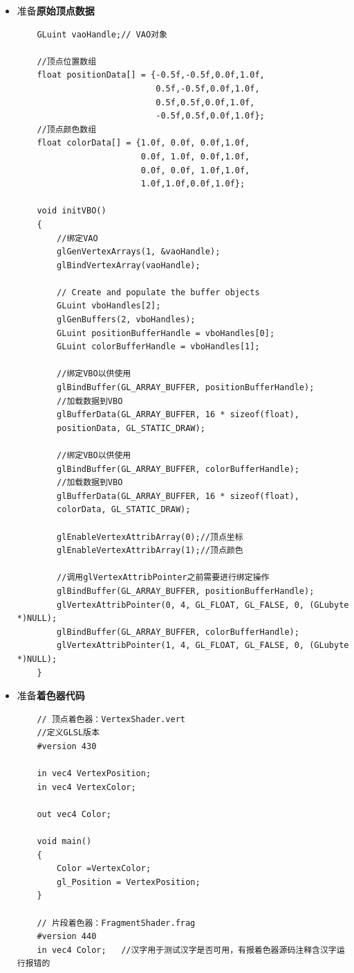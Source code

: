 \documentclass[UTF8,a4paper,8pt]{ctexart}
\begin{document}
					\begin{itemize}[itemindent = 1em]
						\item 准备\textbf{原始顶点数据}
							\begin{lstlisting}
	GLuint vaoHandle;// VAO对象  
	
	//顶点位置数组    
	float positionData[] = {-0.5f,-0.5f,0.0f,1.0f,  
							0.5f,-0.5f,0.0f,1.0f,  
							0.5f,0.5f,0.0f,1.0f,  
							-0.5f,0.5f,0.0f,1.0f};  
	//顶点颜色数组    
	float colorData[] = {1.0f, 0.0f, 0.0f,1.0f,  
					 	 0.0f, 1.0f, 0.0f,1.0f,  
						 0.0f, 0.0f, 1.0f,1.0f,  
						 1.0f,1.0f,0.0f,1.0f};  						
	
	void initVBO()  
	{  
		//绑定VAO  
		glGenVertexArrays(1, &vaoHandle);  
		glBindVertexArray(vaoHandle);  
		
		// Create and populate the buffer objects    
		GLuint vboHandles[2];  
		glGenBuffers(2, vboHandles);  
		GLuint positionBufferHandle = vboHandles[0];  
		GLuint colorBufferHandle = vboHandles[1];  
		
		//绑定VBO以供使用    
		glBindBuffer(GL_ARRAY_BUFFER, positionBufferHandle);  
		//加载数据到VBO    
		glBufferData(GL_ARRAY_BUFFER, 16 * sizeof(float),  
		positionData, GL_STATIC_DRAW);  
		
		//绑定VBO以供使用    
		glBindBuffer(GL_ARRAY_BUFFER, colorBufferHandle);  
		//加载数据到VBO    
		glBufferData(GL_ARRAY_BUFFER, 16 * sizeof(float),  
		colorData, GL_STATIC_DRAW);  
		
		glEnableVertexAttribArray(0);//顶点坐标    
		glEnableVertexAttribArray(1);//顶点颜色    
		
		//调用glVertexAttribPointer之前需要进行绑定操作    
		glBindBuffer(GL_ARRAY_BUFFER, positionBufferHandle);  
		glVertexAttribPointer(0, 4, GL_FLOAT, GL_FALSE, 0, (GLubyte *)NULL);  
		glBindBuffer(GL_ARRAY_BUFFER, colorBufferHandle);  
		glVertexAttribPointer(1, 4, GL_FLOAT, GL_FALSE, 0, (GLubyte *)NULL);  
	}  
							\end{lstlisting}
						\item 准备\textbf{着色器代码}
							\begin{lstlisting}
	// 顶点着色器：VertexShader.vert 
	//定义GLSL版本    
	#version 430    
	
	in vec4 VertexPosition;    
	in vec4 VertexColor;  
	
	out vec4 Color;    
	
	void main()    
	{    
		Color =VertexColor;    
		gl_Position = VertexPosition;  
	}    
	
	// 片段着色器：FragmentShader.frag
	#version 440       
	in vec4 Color;   //汉字用于测试汉字是否可用，有报着色器源码注释含汉字运行报错的  
	

\end{lstlisting}
\end{itemize}
\end{document}
